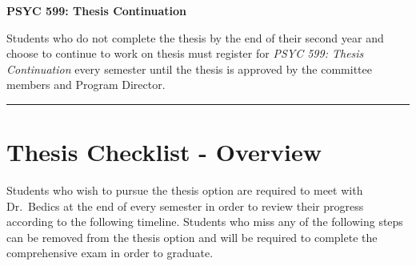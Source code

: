 \documentclass[
  openany]{book}
\begin{document}
\textbf{PSYC 599: Thesis Continuation}

Students who do not complete the thesis by the end of their second year and choose to continue to work on thesis must register for \emph{PSYC 599: Thesis Continuation} every semester until the thesis is approved by the committee members and Program Director.

\begin{center}\rule{0.5\linewidth}{0.5pt}\end{center}

\hypertarget{thesis-checklist---overview}{%
\chapter{Thesis Checklist - Overview}\label{thesis-checklist---overview}}

Students who wish to pursue the thesis option are required to meet with Dr.~Bedics at the end of every semester in order to review their progress according to the following timeline. Students who miss any of the following steps can be removed from the thesis option and will be required to complete the comprehensive exam in order to graduate.
\end{document}
